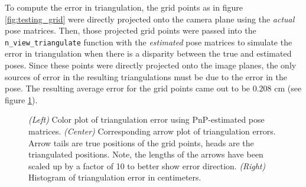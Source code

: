 \documentclass[11pt, letterpaper]{extarticle} %
\begin{document}
To compute the error in triangulation, the grid points as in figure \ref{fig:testing_grid} were directly projected onto the camera plane using the \textit{actual} pose matrices. Then, those projected grid points were passed into the \verb|n_view_triangulate| function with the \textit{estimated} pose matrices to simulate the error in triangulation when there is a disparity between the true and estimated poses. Since these points were directly projected onto the image planes, the only sources of error in the resulting triangulations must be due to the error in the pose. The resulting average error for the grid points came out to be $0.208$ cm (see figure \ref{fig:PnP_error_estimated_poses}).

\begin{figure}[h]
    \centering
    \hfill
    \hfill
    \caption{\textit{(Left)} Color plot of triangulation error using PnP-estimated pose matrices. \textit{(Center)} Corresponding arrow plot of triangulation errors. Arrow tails are true positions of the grid points, heads are the triangulated positions. Note, the lengths of the arrows have been scaled up by a factor of 10 to better show error direction. \textit{(Right)} Histogram of triangulation error in centimeters.}
    \label{fig:PnP_error_estimated_poses}
\end{figure}
\end{document}
